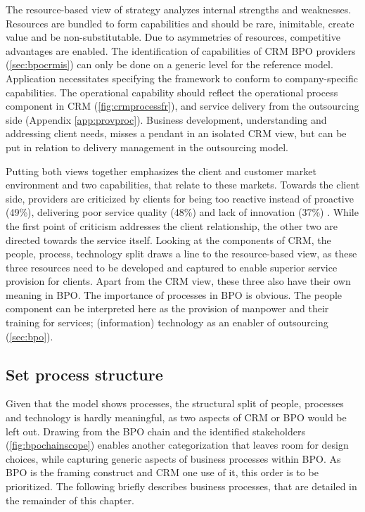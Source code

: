 	The resource-based view of strategy \citep{wernerfelt1984resource} analyzes internal strengths and weaknesses. Resources are bundled to form capabilities and should be rare, inimitable, create value and be non-substitutable. Due to asymmetries of resources, competitive advantages are enabled. The identification of capabilities of CRM BPO providers (\cf \ref{sec:bpocrmis}) can only be done on a generic level for the reference model. Application necessitates specifying the framework to conform to company-specific capabilities. The operational capability should reflect the operational process component in CRM (\cf \Fig \ref{fig:crmprocessfr}), and service delivery from the outsourcing side (\cf Appendix \ref{app:provproc}). Business development, \ie understanding and addressing client needs, misses a pendant in an isolated CRM view, but can be put in relation to delivery management in the outsourcing model. 
	
	Putting both views together emphasizes the client and customer market environment and two capabilities, that relate to these markets. Towards the client side, providers are criticized by clients for being too reactive instead of proactive (49\%), delivering poor service quality (48\%) and lack of innovation (37\%) \citep{deloitte2014outsourcing}. While the first point of criticism addresses the client relationship, the other two are directed towards the service itself. Looking at the components of \acrshort{CRM}, the people, process, technology split draws a line to the resource-based view, as these three resources need to be developed and captured to enable superior service provision for clients. Apart from the  \acrshort{CRM} view, these three also have their own meaning in \acrshort{BPO}.  The importance of processes in  \acrshort{BPO} is obvious. The people component can be interpreted here as the provision of manpower and their training for services; (information) technology as an enabler of outsourcing (\cf \ref{sec:bpo}). 
	
		
	\subsection{Set process structure}
	\label{sec:procstr}
	Given that the model shows processes, the structural split of people, processes and technology is hardly meaningful, as two aspects of  \acrshort{CRM} or \acrshort{BPO} would be left out. Drawing from the BPO chain and the identified stakeholders (\cf \Fig \ref{fig:bpochainscope}) enables another categorization that leaves room for design choices, while capturing generic aspects of business processes within \acrshort{BPO}. As \acrshort{BPO} is the framing construct and  \acrshort{CRM} one use of it, this order is to be prioritized. The following briefly describes business processes, that are detailed in the remainder of this chapter.
	
